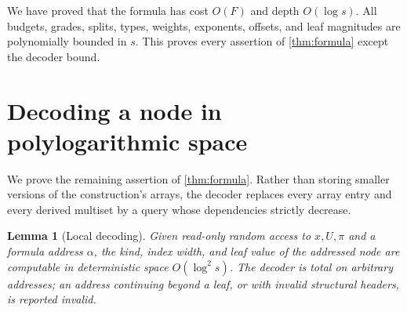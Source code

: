 \documentclass[11pt]{article}
\newtheorem{lemma}[theorem]{Lemma}
\theoremstyle{definition}
\theoremstyle{remark}
\begin{document}
We have proved that the formula has cost $O(F)$ and depth $O(\log s)$. All budgets, grades, splits, types, weights, exponents, offsets, and leaf magnitudes are polynomially bounded in $s$. This proves every assertion of \cref{thm:formula} except the decoder bound.

\section{Decoding a node in polylogarithmic space}\label{sec:decoder}

We prove the remaining assertion of \cref{thm:formula}. Rather than storing smaller versions of the construction's arrays, the decoder replaces every array entry and every derived multiset by a query whose dependencies strictly decrease.

\begin{lemma}[Local decoding]\label{lem:decode}
Given read-only random access to $x,U,\pi$ and a formula address $\alpha$, the kind, index width, and leaf value of the addressed node are computable in deterministic space $O(\log^2s)$. The decoder is total on arbitrary addresses; an address continuing beyond a leaf, or with invalid structural headers, is reported invalid.
\end{lemma}
\end{document}
